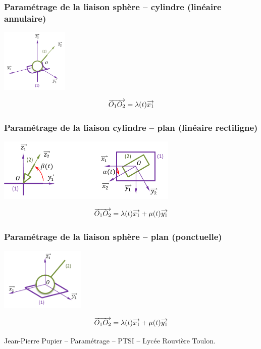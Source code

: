 \documentclass[10pt,oneside]{article}
\begin{document}
\subsubsection{Paramétrage de la liaison sphère -- cylindre (linéaire annulaire)}
\begin{minipage}[c]{.3\linewidth}
\begin{center}
\includegraphics[height=3cm]{png/annulaire_3d}
\end{center}
\end{minipage} \hfill
\begin{minipage}[c]{.65\linewidth}
$$
\overrightarrow{O_1 O_2} = \lambda(t) \overrightarrow{x_1} 
$$
\end{minipage}

\subsubsection{Paramétrage de la liaison cylindre -- plan (linéaire rectiligne)}
\begin{minipage}[c]{.3\linewidth}
\begin{center}
\includegraphics[height=3cm]{png/rectiligne_p}
\end{center}
\end{minipage} \hfill
\begin{minipage}[c]{.65\linewidth}
$$
\overrightarrow{O_1 O_2} = \lambda(t) \overrightarrow{x_1} + \mu(t) \overrightarrow{y_1}
$$
\end{minipage}

\subsubsection{Paramétrage de la liaison sphère -- plan (ponctuelle)}
\begin{minipage}[c]{.3\linewidth}
\begin{center}
\includegraphics[height=3cm]{png/ponctuelle_3d}
\end{center}
\end{minipage} \hfill
\begin{minipage}[c]{.65\linewidth}
$$
\overrightarrow{O_1 O_2} = \lambda(t) \overrightarrow{x_1} + \mu(t) \overrightarrow{y_1}
$$
\end{minipage}



\begin{thebibliography}{2}
 Jean-Pierre Pupier -- Paramétrage -- PTSI -- Lycée Rouvière Toulon.
\end{thebibliography}
\end{document}
